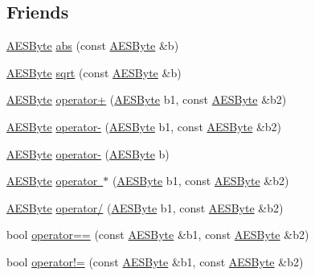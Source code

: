 \subsection*{Friends}
\begin{DoxyCompactItemize}
\item 
\mbox{\hyperlink{class_a_e_s_byte}{A\+E\+S\+Byte}} \mbox{\hyperlink{class_a_e_s_byte_a823c763c6bf4768b6617ff203a095e0a}{abs}} (const \mbox{\hyperlink{class_a_e_s_byte}{A\+E\+S\+Byte}} \&b)
\item 
\mbox{\hyperlink{class_a_e_s_byte}{A\+E\+S\+Byte}} \mbox{\hyperlink{class_a_e_s_byte_abfd90b1a1868876b09f658c44faee894}{sqrt}} (const \mbox{\hyperlink{class_a_e_s_byte}{A\+E\+S\+Byte}} \&b)
\item 
\mbox{\hyperlink{class_a_e_s_byte}{A\+E\+S\+Byte}} \mbox{\hyperlink{class_a_e_s_byte_a77e94a5c6cfd201189b9095d7b9f4975}{operator+}} (\mbox{\hyperlink{class_a_e_s_byte}{A\+E\+S\+Byte}} b1, const \mbox{\hyperlink{class_a_e_s_byte}{A\+E\+S\+Byte}} \&b2)
\item 
\mbox{\hyperlink{class_a_e_s_byte}{A\+E\+S\+Byte}} \mbox{\hyperlink{class_a_e_s_byte_a64350bda7e020c964c4a5d5d3dae7da5}{operator-\/}} (\mbox{\hyperlink{class_a_e_s_byte}{A\+E\+S\+Byte}} b1, const \mbox{\hyperlink{class_a_e_s_byte}{A\+E\+S\+Byte}} \&b2)
\item 
\mbox{\hyperlink{class_a_e_s_byte}{A\+E\+S\+Byte}} \mbox{\hyperlink{class_a_e_s_byte_a50dae6d5f0f12093edf262a703fce1b2}{operator-\/}} (\mbox{\hyperlink{class_a_e_s_byte}{A\+E\+S\+Byte}} b)
\item 
\mbox{\hyperlink{class_a_e_s_byte}{A\+E\+S\+Byte}} \mbox{\hyperlink{class_a_e_s_byte_ae2c9dab2917087c6ffb4b77710f42807}{operator $\ast$}} (\mbox{\hyperlink{class_a_e_s_byte}{A\+E\+S\+Byte}} b1, const \mbox{\hyperlink{class_a_e_s_byte}{A\+E\+S\+Byte}} \&b2)
\item 
\mbox{\hyperlink{class_a_e_s_byte}{A\+E\+S\+Byte}} \mbox{\hyperlink{class_a_e_s_byte_a97933c33582adbe9ef5586661a04e6df}{operator/}} (\mbox{\hyperlink{class_a_e_s_byte}{A\+E\+S\+Byte}} b1, const \mbox{\hyperlink{class_a_e_s_byte}{A\+E\+S\+Byte}} \&b2)
\item 
bool \mbox{\hyperlink{class_a_e_s_byte_a4e20c22693525d6358618f3472d77552}{operator==}} (const \mbox{\hyperlink{class_a_e_s_byte}{A\+E\+S\+Byte}} \&b1, const \mbox{\hyperlink{class_a_e_s_byte}{A\+E\+S\+Byte}} \&b2)
\item 
bool \mbox{\hyperlink{class_a_e_s_byte_ae7ff002e111c7487a5f9e5f63f92b30a}{operator!=}} (const \mbox{\hyperlink{class_a_e_s_byte}{A\+E\+S\+Byte}} \&b1, const \mbox{\hyperlink{class_a_e_s_byte}{A\+E\+S\+Byte}} \&b2)

\end{DoxyCompactItemize}
